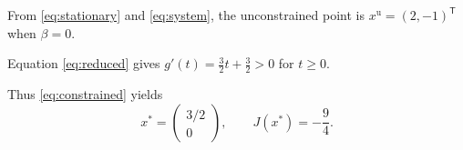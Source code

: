 From \eqref{eq:stationary} and \eqref{eq:system},
the unconstrained point is $x^{\mathrm u}=(2,-1)^{\mathsf T}$
when $\beta=0$.

Equation \eqref{eq:reduced} gives
$g'(t)=\frac32t+\frac32>0$ for $t\ge0$.

Thus \eqref{eq:constrained} yields
\[
x^*=\begin{pmatrix}3/2\\0\end{pmatrix},
\qquad J(x^*)=-\frac94.
\]
